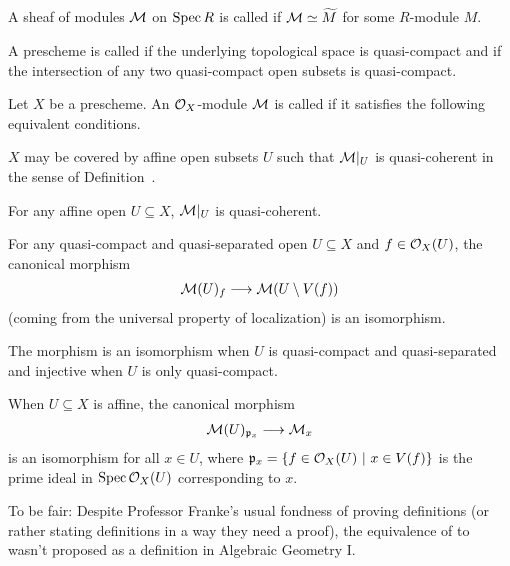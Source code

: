 \documentclass[a4paper,parskip=half,numbers=enddot, DIV=12]{scrreprt}
\begin{document}
\begin{defi}
	A sheaf of modules $\mathcal{M}$ on $\operatorname{Spec} R$ is called  if $\Mm\simeq \snake{M}$ for some $R$-module $M$.
\end{defi}
\begin{defi}
	A prescheme is called  if the underlying topological space is quasi-compact and  if the intersection of any two quasi-compact open subsets is quasi-compact.
\end{defi}

\begin{defi}
	Let $X$ be a prescheme. An $\mathcal{O}_X$-module $\mathcal{M}$ is called  if it satisfies the following equivalent conditions.
	\begin{alphanumerate}
		\item $X$ may be covered by affine open subsets $U$ such that $\mathcal{M}|_U$ is quasi-coherent in the sense of Definition~.
		\item For any affine open $U\subseteq X$, $\mathcal{M}|_U$ is quasi-coherent.
		\item For any quasi-compact and quasi-separated open $U\subseteq X$ and $f\in\mathcal{O}_X(U)$, the canonical morphism
		\begin{align}\lbl{eq:qcIso}
		\Mm(U)_f\morphism\Mm(U\setminus V(f))
		\end{align}
		(coming from the universal property of localization) is an isomorphism.
		\item The morphism  is an isomorphism when $U$ is quasi-compact and quasi-separated and injective when $U$ is only quasi-compact.
		\item When $U\subseteq X$ is affine, the canonical morphism
		\begin{align}\lbl{eq:qcIso2}
		\Mm(U)_{\pp_x}\morphism\Mm_x
		\end{align}
		is an isomorphism for all $x\in U$, where $\mathfrak{p}_x=\left\{f\in\mathcal{O}_X(U)\ \middle|\  x\in V(f)\right\}$ is the prime ideal in $\operatorname{Spec} \mathcal{O}_X(U)$ corresponding to $x$.
	\end{alphanumerate}
\end{defi}
\begin{rem*}
	To be fair: Despite Professor Franke's usual fondness of proving definitions (or rather stating definitions in a way they need a proof), the equivalence of  to  wasn't proposed as a definition in Algebraic Geometry I. 
\end{rem*}
\end{document}
